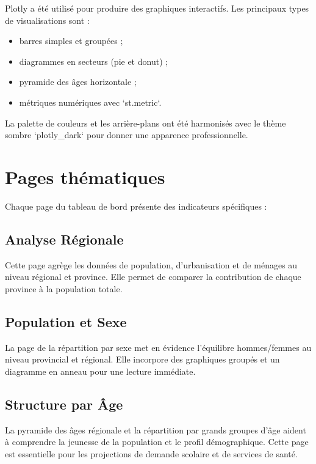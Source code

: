 \documentclass[12pt,a4paper,oneside]{report}
\begin{document}
Plotly a été utilisé pour produire des graphiques interactifs. Les principaux types de visualisations sont :

\begin{itemize}[leftmargin=*]
  \item barres simples et groupées ;
  \item diagrammes en secteurs (pie et donut) ;
  \item pyramide des âges horizontale ;
  \item métriques numériques avec `st.metric`.
\end{itemize}

La palette de couleurs et les arrière-plans ont été harmonisés avec le thème sombre `plotly_dark` pour donner une apparence professionnelle.

\section{Pages thématiques}

Chaque page du tableau de bord présente des indicateurs spécifiques :

\subsection{Analyse Régionale}

Cette page agrège les données de population, d'urbanisation et de ménages au niveau régional et province. Elle permet de comparer la contribution de chaque province à la population totale.

\subsection{Population et Sexe}

La page de la répartition par sexe met en évidence l'équilibre hommes/femmes au niveau provincial et régional. Elle incorpore des graphiques groupés et un diagramme en anneau pour une lecture immédiate.

\subsection{Structure par Âge}

La pyramide des âges régionale et la répartition par grands groupes d'âge aident à comprendre la jeunesse de la population et le profil démographique. Cette page est essentielle pour les projections de demande scolaire et de services de santé.
\end{document}
